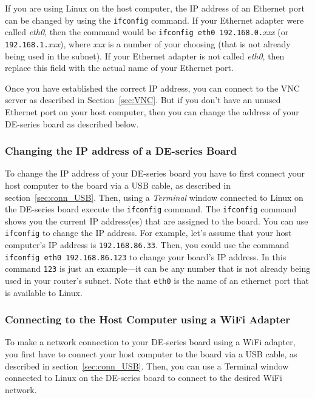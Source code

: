 \documentclass[11pt, twoside, pdftex]{article}
\begin{document}
If you are using Linux on the host computer, the IP address of an Ethernet port 
can be changed by using the
\texttt{ifconfig} command. If your Ethernet adapter were called {\it eth0}, then the command 
would be \texttt{ifconfig eth0 192.168.0.}{\it xxx} 
(or \texttt{192.168.1.}{\it xxx}), where {\it xxx} is a number
of your choosing (that is not already being used in the subnet). If your Ethernet adapter
is not called {\it eth0}, then replace this field with the actual name of your Ethernet port.

Once you have established the correct IP address, you can connect to the VNC server as
described in Section~\ref{sec:VNC}. But if 
you don't have an unused Ethernet port on your host computer, then you can
change the address of your DE-series board as described below.

\subsubsection*{Changing the IP address of a DE-series Board}

To change the IP address of your DE-series board you have to first connect your host computer
to the board via a USB cable, as described in section~\ref{sec:conn_USB}. Then, using a 
{\it Terminal} window connected to Linux on the DE-series board execute the \texttt{ifconfig} 
command. The \texttt{ifconfig} command shows you the current IP address(es) that are
assigned to the board. You can use \texttt{ifconfig} to change the IP address. For example, 
let's assume that your host computer's IP address is \texttt{192.168.86.33}. Then, you could 
use the command \texttt{ifconfig eth0 192.168.86.123} to change your board's IP address.
In this command \texttt{123} is just an example---it can be any number that is not
already being used in your router's subnet. Note that \texttt{eth0} is the name of an ethernet
port that is available to Linux.

\subsubsection{Connecting to the Host Computer using a WiFi Adapter}
\label{sec:WiFi}

To make a network connection to your DE-series board using a WiFi adapter, you first have to 
connect your host computer to the board via a USB cable, as described in 
section~\ref{sec:conn_USB}. Then, you can use a Terminal window connected to Linux on 
the DE-series board to connect to the desired WiFi network. 
\end{document}

